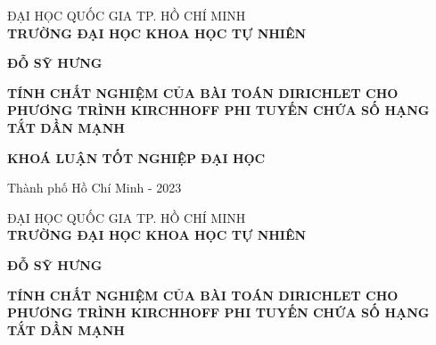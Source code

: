 \documentclass[12pt,a4paper]{article}
\theoremstyle{definition}
\theoremstyle{definition}
\begin{document}
\begin{titlepage}

\thispagestyle{empty}

\begin{center}
\vspace*{0.3cm}
{\fontsize{14}{1}\selectfont  ĐẠI HỌC QUỐC GIA TP. HỒ CHÍ MINH}\\
{\fontsize{14}{1}\selectfont\bf TRƯỜNG ĐẠI HỌC KHOA HỌC TỰ NHIÊN}\\
\hfill

\vspace*{3cm}

{\fontsize{14}{1}\selectfont\bf ĐỖ SỸ HƯNG}

\vspace*{3cm}

{\fontsize{16}{1}\selectfont \bf { TÍNH CHẤT NGHIỆM CỦA BÀI TOÁN DIRICHLET CHO PHƯƠNG TRÌNH KIRCHHOFF PHI TUYẾN CHỨA SỐ HẠNG TẮT DẦN MẠNH }}

\vspace*{4cm}

{\fontsize{14}{1}\selectfont\bf KHOÁ LUẬN TỐT NGHIỆP ĐẠI HỌC}

\vfill

{\fontsize{12}{1}\selectfont Thành phố Hồ Chí Minh - 2023}
\end{center}
\vspace*{0.5cm}


\end{titlepage}

\newpage
\thispagestyle{empty}


\begin{center}
\vspace*{0.3cm}
{\fontsize{14}{1}\selectfont  ĐẠI HỌC QUỐC GIA TP. HỒ CHÍ MINH}\\
{\fontsize{14}{1}\selectfont\bf TRƯỜNG ĐẠI HỌC KHOA HỌC TỰ NHIÊN}\\
\vspace*{3cm}

{\fontsize{14}{1}\selectfont\bf ĐỖ SỸ HƯNG}

\vspace*{3cm}

{\fontsize{16}{1}\selectfont \bf {TÍNH CHẤT NGHIỆM CỦA BÀI TOÁN DIRICHLET CHO PHƯƠNG TRÌNH KIRCHHOFF PHI TUYẾN CHỨA SỐ HẠNG TẮT DẦN MẠNH
}}

\vspace*{2cm}

\end{center}
 
\end{document}
